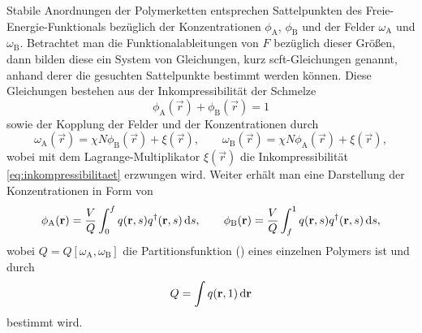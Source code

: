 \documentclass[../main.tex]{subfiles}
\begin{document}
Stabile Anordnungen der Polymerketten entsprechen Sattelpunkten des Freie-Energie-Funktionals bezüglich der Konzentrationen $\phi_{\mathrm{A}}$, $\phi_{\mathrm{B}}$ und der Felder $\omega_{\mathrm{A}}$ und $\omega_{\mathrm{B}}$.
Betrachtet man die Funktionalableitungen von $F$ bezüglich dieser Größen, dann bilden diese ein System von Gleichungen, kurz \ac{scft}-Gleichungen genannt, anhand derer die gesuchten Sattelpunkte bestimmt werden können.
Diese Gleichungen bestehen aus der Inkompressibilität der Schmelze
\begin{equation}
\label{eq:inkompressibilitaet}
    \phi_{\mathrm{A}}(\vec{r}) + \phi_{\mathrm{B}}(\vec{r}) = 1
\end{equation}%
sowie der Kopplung der Felder und der Konzentrationen durch
\begin{equation}
\label{eq:felder}
    \omega_{\mathrm{A}}(\vec{r}) = \chi N \phi_{\mathrm{B}}(\vec{r}) + \xi(\vec{r}), \qquad
    \omega_{\mathrm{B}}(\vec{r}) = \chi N \phi_{\mathrm{A}}(\vec{r}) + \xi(\vec{r}),
\end{equation}%
wobei mit dem Lagrange-Multiplikator $\xi(\vec{r})$ die Inkompressibilität \cref{eq:inkompressibilitaet} erzwungen wird.
Weiter erhält man eine Darstellung der Konzentrationen in Form von
\begin{equation}
\label{eq:konzentrationen}
    \phi_{\mathrm{A}}(\mathbf{r}) = \frac{V}{Q} \int_{0}^{f} q(\mathbf{r}, s) q^{\dagger}(\mathbf{r}, s) \mathop{}\!\mathrm{d} s, \qquad
    \phi_{\mathrm{B}}(\mathbf{r}) = \frac{V}{Q} \int_{f}^{1} q(\mathbf{r}, s) q^{\dagger}(\mathbf{r}, s) \mathop{}\!\mathrm{d} s,
\end{equation}%
wobei $Q = Q[\omega_{\mathrm{A}}, \omega_{\mathrm{B}}]$ die Partitionsfunktion () eines einzelnen Polymers ist und durch
\begin{equation}
\label{eq:partitionsfunktion}
    Q = \int q(\mathbf{r}, 1) \mathop{}\!\mathrm{d} \mathbf{r}
\end{equation}%
bestimmt wird.
\end{document}
